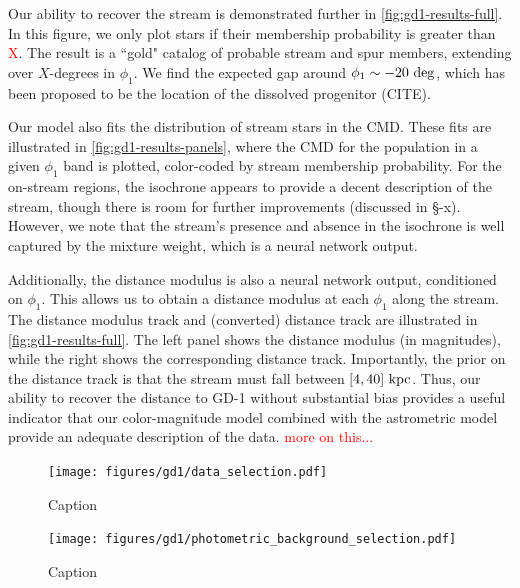 \documentclass[twocolumn]{aastex631}
\newcommand{\TODO}[1]{{\textcolor{red}{#1}}}
\newcommand{\JN}[1]{\TODO{#1}}
\begin{document}
        Our ability to recover the stream is demonstrated further in
        \autoref{fig:gd1-results-full}. In this figure, we only plot stars if
        their membership probability is greater than \JN{X}. The result is a
        ``gold" catalog of probable stream and spur members, extending over
        $X$-degrees in $\phi_1$. We find the expected gap around $\phi_1 \sim
        -20~\rm{deg}$, which has been proposed to be the location of the
        dissolved progenitor (CITE).

        Our model also fits the distribution of stream stars in the CMD. These
        fits are illustrated in \autoref{fig:gd1-results-panels}, where the CMD
        for the population in a given $\phi_1$ band is plotted, color-coded by
        stream membership probability. For the on-stream regions, the isochrone
        appears to provide a decent description of the stream, though there is
        room for further improvements (discussed in \S-x). However, we note that
        the stream's presence and absence in the isochrone is well captured by
        the mixture weight, which is a neural network output. 
        
        Additionally, the distance modulus is also a neural network output,
        conditioned on $\phi_1$. This allows us to obtain a distance modulus at
        each $\phi_1$ along the stream. The distance modulus track and
        (converted) distance track are illustrated in
        \autoref{fig:gd1-results-full}. The left panel shows the distance
        modulus (in magnitudes), while the right shows the corresponding
        distance track. Importantly, the prior on the distance track is that the
        stream must fall between $[4,40]~\rm{kpc}$. Thus, our ability to recover
        the distance to GD-1 without substantial bias provides a useful
        indicator that our color-magnitude model combined with the astrometric
        model provide an adequate description of the data. \JN{more on this...}

        \begin{figure}[h]
            \centering
            \texttt{[image: figures/gd1/data\_selection.pdf]}
            \caption{Caption}
            \label{fig:gd1-data_selection}
        \end{figure}

        \begin{figure}
            \centering
            \texttt{[image: figures/gd1/photometric\_background\_selection.pdf]}
            \caption{Caption}
            \label{fig:gd1-photometric_background_selection}
        \end{figure}
\end{document}
